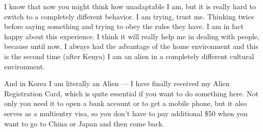 \begin{post}
\begin{content}
I know that now you might think how unadaptable I am, but it is really hard to switch to a completely different behavior. I am trying, trust me. Thinking twice before saying something and trying to obey the rules they have. I am in fact happy about this experience. I think it will really help me in dealing with people, because until now, I always had the advantage of the home environment and this is the second time (after Kenya) I am an alien in a completely different cultural environment.

And in Korea I am literally an Alien — I have finally received my Alien Registration Card, which is quite essential if you want to do something here. Not only you need it to open a bank account or to get a mobile phone, but it also serves as a multientry visa, so you don't have to pay additional \$50 when you want to go to China or Japan and then come back.


\end{content}
\end{post}
